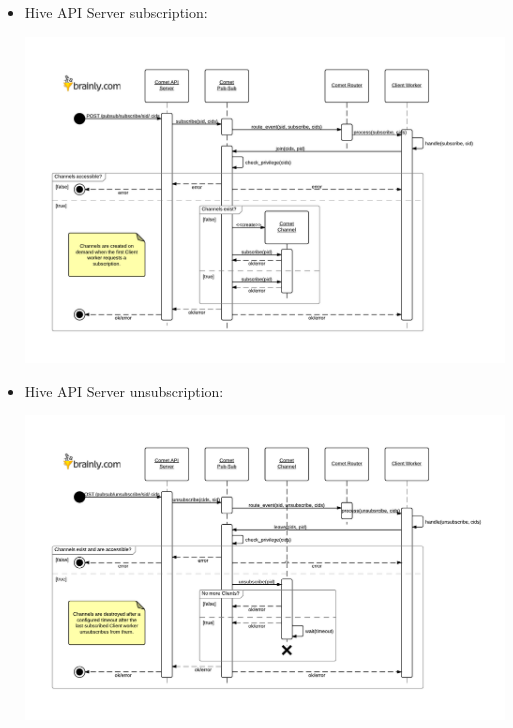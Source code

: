 \documentclass[a4paper]{article}
\begin{document}
\pagebreak
\begin{landscape}
\begin{itemize}

\item Hive API Server subscription:
\label{sec-7-3-4-1}%
\begin{center}
\includegraphics[scale=0.85]{./img/pubsub_api_subscription.pdf}
\end{center}

\pagebreak

\item Hive API Server unsubscription:
\label{sec-7-3-4-2}%
\begin{center}
\includegraphics[scale=0.9]{./img/pubsub_api_unsubscription.pdf}
\end{center}

\pagebreak



\end{itemize}
\end{landscape}
\end{document}
